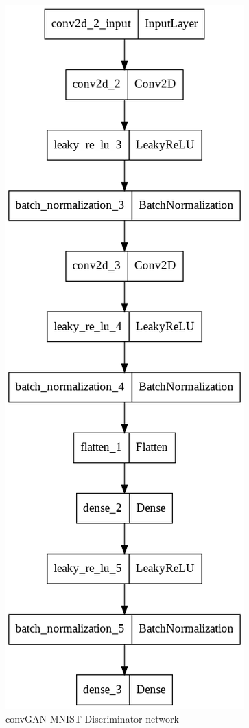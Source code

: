 \documentclass[conference]{IEEEtran}
\begin{document}
\begin{figure}[h]
\centering
\includegraphics[scale = 0.25]{convGAN_MNIST_disc_model.png}
  \caption{convGAN MNIST Discriminator network}
\end{figure}
\end{document}
